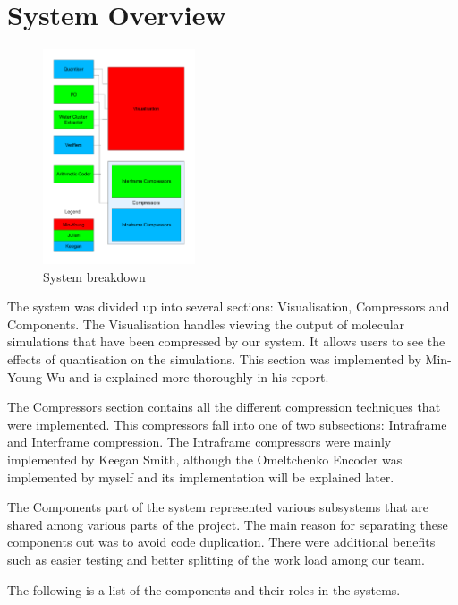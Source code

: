 \documentclass[a4paper,11pt]{report}
\begin{document}
\section{System Overview}

\begin{figure}
 \center
 \includegraphics[width=0.4\textwidth]{resources/Breakdown-connect.pdf}
\caption{System breakdown}
\label{sysbreak}
\end{figure}

The system was divided up into several sections: Visualisation, Compressors and Components. The Visualisation handles viewing the output of molecular simulations that have been compressed by our system. It allows users to see the effects of quantisation on the simulations. This section was implemented by Min-Young Wu and is explained more thoroughly in his report. 

The Compressors section contains all the different compression techniques that were implemented. This compressors fall into one of two subsections: Intraframe and Interframe compression. The Intraframe compressors were mainly implemented by Keegan Smith, although the Omeltchenko Encoder was implemented by myself and its implementation will be explained later.

The Components part of the system represented various subsystems that are shared among various parts of the project. The main reason for separating these components out was to avoid code duplication. There were additional benefits such as easier testing and better splitting of the work load among our team.

The following is a list of the components and their roles in the systems. \\ \\ \\
\end{document}
